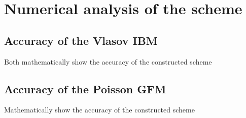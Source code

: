 \section{Numerical analysis of the scheme}
\subsection{Accuracy of the Vlasov IBM}
Both mathematically show the accuracy of the constructed scheme 

\subsection{Accuracy of the Poisson GFM}
Mathematically show the accuracy of the constructed scheme